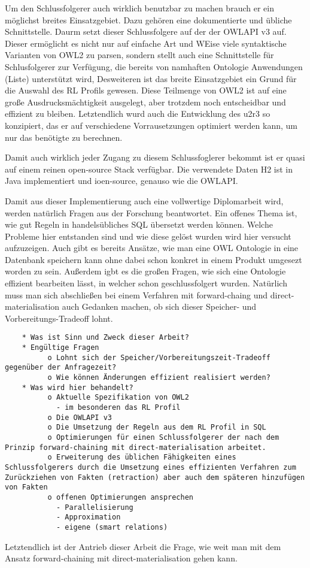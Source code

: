 Um den Schlussfolgerer auch wirklich benutzbar zu machen brauch er ein möglichst breites Einsatzgebiet. Dazu gehören eine dokumentierte und übliche Schnittstelle. Daurm setzt dieser Schlussfolgere auf der der OWLAPI v3 \cite{OWLAPI} auf. Dieser ermöglicht es nicht nur auf einfache Art und WEise viele syntaktische Varianten von OWL2 zu parsen, sondern stellt auch eine Schnittstelle für Schlusfolgerer zur Verfügung, die bereits von namhaften Ontologie Anwendungen (Liste) unterstützt wird, Desweiteren ist das breite Einsatzgebiet ein Grund für die Auswahl des RL Profils gewesen. Diese Teilmenge von OWL2 ist auf eine große Ausdrucksmächtigkeit ausgelegt, aber trotzdem noch entscheidbar und effizient zu bleiben. Letztendlich wurd auch die Entwicklung des u2r3 so konzipiert, das er auf verschiedene Vorrausetzungen optimiert werden kann, um nur das benötigte zu berechnen.

Damit auch wirklich jeder Zugang zu diesem Schlussfoglerer bekommt ist er quasi auf einem reinen open-source Stack verfügbar. Die verwendete Daten H2 ist in Java implementiert und ioen-source, genauso wie die OWLAPI.

Damit aus dieser Implementierung auch eine vollwertige Diplomarbeit wird, werden natürlich Fragen aus der Forschung beantwortet. Ein offenes Thema ist, wie gut Regeln in handelsübliches SQL übersetzt werden können. Welche Probleme hier entstanden sind und wie diese gelöst wurden wird hier versucht aufzuzeigen. Auch gibt es bereits Ansätze, wie man eine OWL Ontologie in eine Datenbank speichern kann \cite{Kleb2009OWLDB} ohne dabei schon konkret in einem Produkt umgesezt worden zu sein. Außerdem igbt es die großen Fragen, wie sich eine Ontologie effizient bearbeiten lässt, in welcher schon geschlussfolgert wurden. Natürlich muss man sich abschließen bei einem Verfahren mit forward-chaing und direct-materialisation auch Gedanken machen, ob sich dieser Speicher- und Vorbereitungs-Tradeoff lohnt.

\begin{verbatim}
    * Was ist Sinn und Zweck dieser Arbeit?
    * Engültige Fragen
          o Lohnt sich der Speicher/Vorbereitungszeit-Tradeoff gegenüber der Anfragezeit?
          o Wie können Änderungen effizient realisiert werden? 
    * Was wird hier behandelt?
          o Aktuelle Spezifikation von OWL2
            - im besonderen das RL Profil
          o Die OWLAPI v3
          o Die Umsetzung der Regeln aus dem RL Profil in SQL
          o Optimierungen für einen Schlussfolgerer der nach dem Prinzip forward-chaining mit direct-materialisation arbeitet.
          o Erweiterung des üblichen Fähigkeiten eines Schlussfolgerers durch die Umsetzung eines effizienten Verfahren zum Zurückziehen von Fakten (retraction) aber auch dem späteren hinzufügen von Fakten
          o offenen Optimierungen ansprechen
            - Parallelisierung
            - Approximation
            - eigene (smart relations)
\end{verbatim}

Letztendlich ist der Antrieb dieser Arbeit die Frage, wie weit man mit dem Ansatz forward-chaining mit direct-materialisation gehen kann.